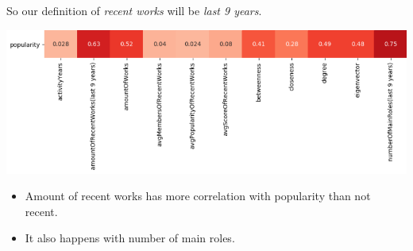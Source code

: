 \begin{frame}
So our definition of \emph{recent works} will be \emph{last 9 years}.
\begin{center}
\includegraphics[scale=0.45]{graphics/popCorrelationRecentWorks.png} 
\end{center}
\begin{itemize}
\item Amount of recent works has more correlation with popularity than not recent.
\item It also happens with number of main roles.
\end{itemize}
\end{frame}

